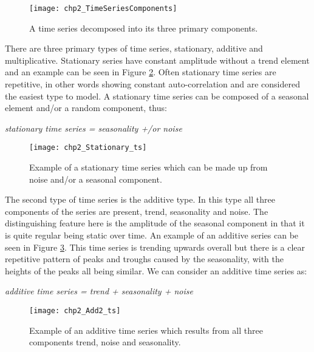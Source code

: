 \begin{figure}[tbph!]
\centering
\texttt{[image: chp2\_TimeSeriesComponents]}
\caption[A time series decomposed into primary components]{A time series decomposed into its three primary components.}
\label{fig:TimeSeriesComponents}
\end{figure}

There are three primary types of time series, stationary, additive and multiplicative. Stationary series have constant amplitude without a trend element and an example can be seen in Figure \ref{fig:Stationary_ts}. Often stationary time series are repetitive, in other words showing constant auto-correlation and are considered the easiest type to model. A stationary time series can be composed of a seasonal element and/or a random component, thus:

\begin{center}
\textit{stationary time series = seasonality +/or noise}
\end{center}

\begin{figure}[tbph!]
\centering
\texttt{[image: chp2\_Stationary\_ts]}
\caption[A stationary time series]{Example of a stationary time series which can be made up from noise and/or a seasonal component.}
\label{fig:Stationary_ts}
\end{figure}

The second type of time series is the additive type. In this type all three components of the series are present, trend, seasonality and noise. The distinguishing feature here is the amplitude of the seasonal component in that it is quite regular being static over time. An example of an additive series can be seen in Figure \ref{fig:Add2_ts}. This time series is trending upwards overall but there is a clear repetitive pattern of peaks and troughs caused by the seasonality, with the heights of the peaks all being similar. We can consider an additive time series as:

\begin{center}
\textit{additive time series = trend + seasonality + noise}
\end{center}

\begin{figure}[tbph!]
\centering
\texttt{[image: chp2\_Add2\_ts]}
\caption[An additive time series]{Example of an additive time series which results from all three components trend, noise and seasonality.}
\label{fig:Add2_ts}
\end{figure}


